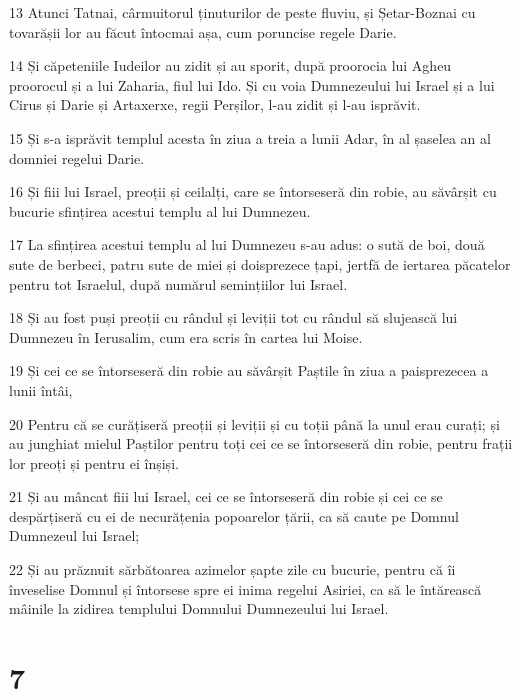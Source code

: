 \par 13 Atunci Tatnai, cârmuitorul ținuturilor de peste fluviu, și Șetar-Boznai cu tovarășii lor au făcut întocmai așa, cum poruncise regele Darie.
\par 14 Și căpeteniile Iudeilor au zidit și au sporit, după proorocia lui Agheu proorocul și a lui Zaharia, fiul lui Ido. Și cu voia Dumnezeului lui Israel și a lui Cirus și Darie și Artaxerxe, regii Perșilor, l-au zidit și l-au isprăvit.
\par 15 Și s-a isprăvit templul acesta în ziua a treia a lunii Adar, în al șaselea an al domniei regelui Darie.
\par 16 Și fiii lui Israel, preoții și ceilalți, care se întorseseră din robie, au săvârșit cu bucurie sfințirea acestui templu al lui Dumnezeu.
\par 17 La sfințirea acestui templu al lui Dumnezeu s-au adus: o sută de boi, două sute de berbeci, patru sute de miei și doisprezece țapi, jertfă de iertarea păcatelor pentru tot Israelul, după numărul semințiilor lui Israel.
\par 18 Și au fost puși preoții cu rândul și leviții tot cu rândul să slujească lui Dumnezeu în Ierusalim, cum era scris în cartea lui Moise.
\par 19 Și cei ce se întorseseră din robie au săvârșit Paștile în ziua a paisprezecea a lunii întâi,
\par 20 Pentru că se curățiseră preoții și leviții și cu toții până la unul erau curați; și au junghiat mielul Paștilor pentru toți cei ce se întorseseră din robie, pentru frații lor preoți și pentru ei înșiși.
\par 21 Și au mâncat fiii lui Israel, cei ce se întorseseră din robie și cei ce se despărțiseră cu ei de necurățenia popoarelor țării, ca să caute pe Domnul Dumnezeul lui Israel;
\par 22 Și au prăznuit sărbătoarea azimelor șapte zile cu bucurie, pentru că îi înveselise Domnul și întorsese spre ei inima regelui Asiriei, ca să le întărească mâinile la zidirea templului Domnului Dumnezeului lui Israel.

\chapter{7}

